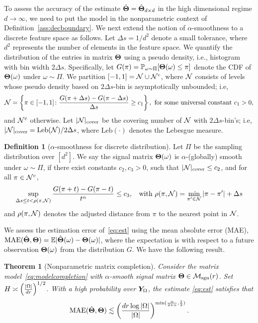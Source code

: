 \documentclass[aos]{imsart}
\newtheorem{theorem}{Theorem}%
\theoremstyle{definition}
\newtheorem{definition}{Definition}
\def\caliM{\tM_{\textup{sgn}}}
\begin{document}
\noindent
To assess the accuracy of the estimate $\hat {\bm{\Theta}}=\hat {\bm{\Theta}}_{d\times d}$ in the high dimensional regime $d\to \infty$, we need to put the model in the nonparametric context of Definition~\ref{ass:decboundary}. We next extend the notion of $\alpha$-smoothness to a discrete feature space as follows. Let $\Delta s = 1/d^2$ denote a small tolerance, where $d^2$ represents the number of elements in the feature space. We quantify the distribution of the entries in matrix $\bm{\Theta}$ using a pseudo density, i.e., histogram with bin width $2\Delta s$. Specifically, let $G(\pi)=\mathbb{P}_{\omega\sim \Pi}[\bm{\Theta}(\omega)\leq \pi]$ denote the CDF of $\bm{\Theta}(\omega)$ under $\omega\sim \Pi$. We partition $[-1,1]=\mathcal{N} \cup \mathcal{N}^c$, where $\mathcal{N}$ consists of levels whose pseudo density based on $2\Delta s$-bin is asymptotically unbounded; i.e,
\[
\mathcal{N}=\left\{\pi\in[-1,1] \colon {G(\pi+{\Delta s})-G(\pi-{\Delta s})\over \Delta s} \geq c_1 \right\},\ \text{for some universal constant }c_1>0,
\]
and $\mathcal{N}^c$ otherwise. Let $|\mathcal{N}|_{\text{cover}}$ be the covering number of $\mathcal{N}$ with $2\Delta s$-bin's; i.e, $|\mathcal{N}|_{\text{cover}} =\text{Leb}(\mathcal{N})/2\Delta s$, where $\text{Leb}(\cdot)$ denotes the Lebesgue measure. 

\begin{definition}[$\alpha$-smoothness for discrete distribution] Let $\Pi$ be the sampling distribution over $[d^2]$. We say the signal matrix $\bm{\Theta}(\omega)$ is $\alpha$-(globally) smooth under $\omega\sim \Pi$, if there exist constants $c_2,c_3>0$, such that $|\mathcal{N}|_{\text{cover}}\leq c_2$, and for all $\pi \in\mathcal{N}^c$, 
\begin{equation*} \label{eq:smooth}
\sup_{\Delta s \leq t<\rho(\pi, \tN)}{G(\pi+{t})-G(\pi-{t})\over t^\alpha} \leq c_3, \;\; \text{ with } \rho(\pi,\tN)=\min_{\pi'\in \tN}|\pi-\pi'|+\Delta s 
\end{equation*}
and $\rho(\pi,\mathcal{N})$ denotes the adjusted distance from $\pi$ to the nearest point in $\mathcal{N}$. 
\end{definition}
We assess the estimation error of~\eqref{eq:est} using the mean absolute error (MAE), $\text{MAE}(\hat {\bm{\Theta}}, \bm{\Theta}) = \mathbb{E}|\hat {\bm{\Theta}}(\omega)-\bm{\Theta}(\omega)|$, where the expectation is with respect to a future observation $\bm{\Theta}(\omega)$ from the distribution $G$.  We have the following result. 

\begin{theorem}[Nonparametric matrix completion]\label{thm:estimation} 
Consider the matrix model~\eqref{eq:modelcompletion} with $\alpha$-smooth signal matrix $\mTheta\in\caliM(r)$. Set $H \asymp \left( |\Omega|\over dr\right)^{1/2}$. With a high probability over $\bm Y_\Omega$, the estimate \eqref{eq:est} satisfies that
\begin{equation}\label{eq:real}
\textup{MAE}(\hat \mTheta, \mTheta)\lesssim \left(dr \log|\Omega| \over |\Omega|\right)^{\min({\alpha \over 2+\alpha}, {1\over 2})}.
\end{equation}
\end{theorem}
\end{document}
